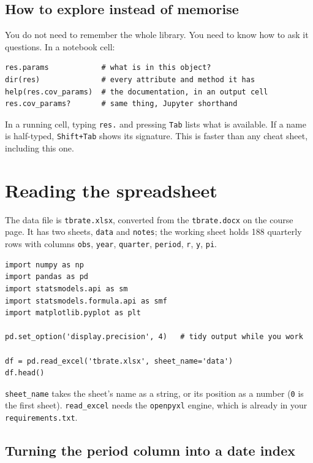 \documentclass[11pt]{article}
\newcommand{\code}[1]{\texttt{#1}}
\begin{document}
\subsection{How to explore instead of memorise}

You do not need to remember the whole library. You need to know how to ask it
questions. In a notebook cell:

\begin{lstlisting}
res.params            # what is in this object?
dir(res)              # every attribute and method it has
help(res.cov_params)  # the documentation, in an output cell
res.cov_params?       # same thing, Jupyter shorthand
\end{lstlisting}

\noindent In a running cell, typing \code{res.} and pressing \code{Tab} lists
what is available. If a name is half-typed, \code{Shift+Tab} shows its
signature. This is faster than any cheat sheet, including this one.

\section{Reading the spreadsheet}

The data file is \code{tbrate.xlsx}, converted from the \code{tbrate.docx} on the
course page. It has two sheets, \code{data} and \code{notes}; the working sheet
holds 188 quarterly rows with columns \code{obs}, \code{year}, \code{quarter},
\code{period}, \code{r}, \code{y}, \code{pi}.

\begin{lstlisting}
import numpy as np
import pandas as pd
import statsmodels.api as sm
import statsmodels.formula.api as smf
import matplotlib.pyplot as plt

pd.set_option('display.precision', 4)   # tidy output while you work

df = pd.read_excel('tbrate.xlsx', sheet_name='data')
df.head()
\end{lstlisting}

\noindent\code{sheet\_name} takes the sheet's name as a string, or its position
as a number (\code{0} is the first sheet). \code{read\_excel} needs the
\code{openpyxl} engine, which is already in your \code{requirements.txt}.

\subsection{Turning the period column into a date index}
\end{document}
